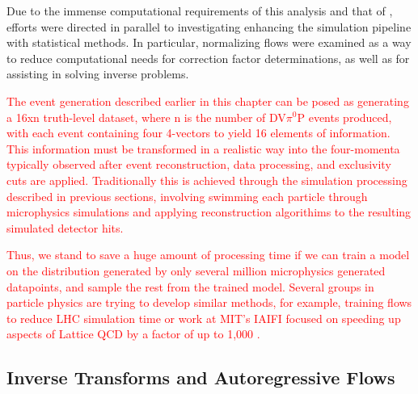 Due to the immense computational requirements of this analysis and that of \parencite{Lee2022MeasurementDetector}, efforts were directed in parallel to investigating enhancing the simulation pipeline with statistical methods. In particular, normalizing flows were examined as a way to reduce computational needs for correction factor determinations, as well as for assisting in solving inverse problems. 

    \textcolor{red}{ The event generation described earlier in this chapter can be posed as generating a 16xn truth-level dataset, where n is the number of DV$\pi^0$P events produced, with each event containing four 4-vectors to yield 16 elements of information. This information must be transformed in a realistic way into the four-momenta typically observed after event reconstruction, data processing, and exclusivity cuts are applied. Traditionally this is achieved through the simulation processing described in previous sections, involving swimming each particle through microphysics simulations and applying reconstruction algorithims to the resulting simulated detector hits. }
    

    \textcolor{red}{  Thus, we stand to save a huge amount of processing time if we can train a model on the distribution generated by only several million microphysics generated datapoints, and sample the rest from the trained model. Several groups in particle physics are trying to develop similar methods, for example, training flows to reduce LHC simulation time \parencite{Weisser2021ThePhysics} or work at MIT's IAIFI focused on speeding up aspects of Lattice QCD by a factor of up to 1,000 \parencite{Kanwar2020EquivariantTheory}.}
    
\subsection{Inverse Transforms and Autoregressive Flows}
    
